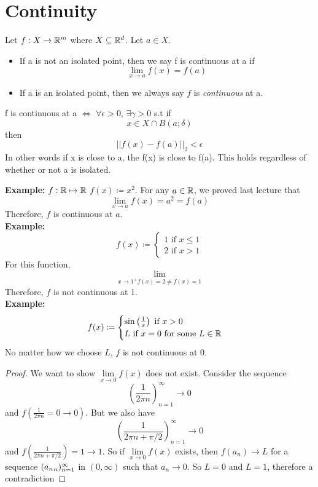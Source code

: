 \documentclass[openany]{report}
\begin{document}
\section{Continuity}
\begin{definition}
    Let $f: X\rightarrow \mathbb{R}^m$ where $X \subseteq \mathbb{R}^d$. Let $a \in X$.
    \begin{itemize}
        \item If a is not an isolated point, then we say f is continuous at a if 
        \[\lim_{x\rightarrow a}f(x) = f(a)\]
        \item If a is an isolated point, then we always say $f$ is \emph{continuous} at a.
    \end{itemize}
\end{definition}
\begin{definition}
    f is continuous at a $\iff$ $\forall \epsilon > 0$, $\exists \gamma > 0$ s.t if
    \[x \in X \cap B(a; \delta)\]
    then 
    \[||f(x) - f(a)||_2 < \epsilon\]
    In other words if x is close to a, the f(x) is close to f(a). This holds regardless of whether or not a is isolated.
\end{definition}
\noindent
\textbf{Example:} $f: \mathbb{R} \mapsto \mathbb{R}$ $f(x) \coloneqq x^2$. For any $a \in \mathbb{R}$, we proved last lecture that 
\[\lim_{x\rightarrow a}f(x) = a^2 = f(a)\]
Therefore, $f$ is continuous at $a$.\\[2ex]
\textbf{Example:} 
\[f(x) \coloneqq \begin{cases}
    1 \text{  if } x \leq 1\\
    2 \text{  if } x > 1
\end{cases}\]
For this function, 
\[\lim_{x \rightarrow 1^+ f(x) = 2 \neq f(x) = 1}\]
Therefore, $f$ is not continuous at 1.\\[2ex]
\textbf{Example:} 
\[f(x) \coloneqq \begin{cases}
    \sin\left(\frac{1}{x}\right) \text{  if } x > 0\\
    L \text{  if } x = 0 \text{ for some $L \in \mathbb{R}$}\\
\end{cases}\]
No matter how we choose $L$, $f$ is not continuous at 0. 
\begin{proof}
    We want to show $\lim\limits_{x \rightarrow 0}f(x)$ does not exist. Consider the sequence 
    \[\left(\frac{1}{2\pi n}\right)^\infty_{n=1} \rightarrow 0\]
    and $f\left(\frac{1}{2\pi n} = 0 \rightarrow 0\right)$. But we also have 
    \[\left(\frac{1}{2\pi n + \pi/2}\right)_{n=1}^\infty \rightarrow 0\]
    and $f\left(\frac{1}{2\pi n + \pi/2}\right) = 1 \rightarrow 1$. So if $\lim\limits_{x \rightarrow 0}f(x)$ exists, then $f(a_n) \rightarrow L$ for a sequence $({a_n}_n)_{n=1}^\infty$ in $(0, \infty)$ such that $a_n \rightarrow 0$. So $L = 0$ and $L = 1$, therefore a contradiction
\end{proof}
\end{document}
